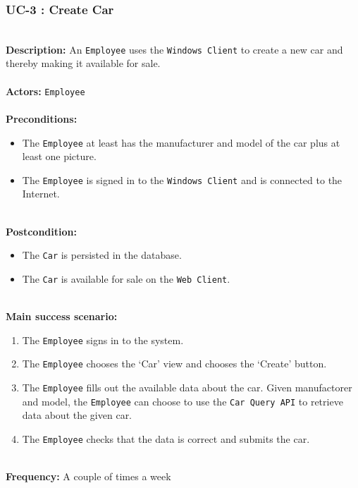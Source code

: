 \subsubsection{UC-3 : Create Car}
\label{create_car_use_case}
\HRule \\[0.4cm]
\textbf{Description:} An \texttt{Employee} uses the \texttt{Windows Client} to create a new car and thereby making it available for sale. \\
\HRule \\[0.4cm]
\textbf{Actors:} \texttt{Employee}\\
\HRule \\[0.4cm]
\textbf{Preconditions:} 
\begin{itemize}
    \item The \texttt{Employee} at least has the manufacturer and model of the car plus at least one picture.
    \item The \texttt{Employee} is signed in to the \texttt{Windows Client} and is connected to the Internet.
\end{itemize}
\HRule \\[0.4cm]
\textbf{Postcondition:}
\begin{itemize}
    \item The \texttt{Car} is persisted in the database.
    \item The \texttt{Car} is available for sale on the \texttt{Web Client}.
\end{itemize}
\HRule \\[0.4cm]
\textbf{Main success scenario:}
\begin{enumerate}
    \item The \texttt{Employee} signs in to the system.
    \item The \texttt{Employee} chooses the `Car' view and chooses the `Create' button.
    \item The \texttt{Employee} fills out the available data about the car. Given manufactorer and model, the \texttt{Employee} can choose to use the \texttt{Car Query API} to retrieve data about the given car.
    \item The \texttt{Employee} checks that the data is correct and submits the car.
\end{enumerate}
\HRule \\[0.4cm]
\textbf{Frequency:}
A couple of times a week \\
\HRule \\[0.4cm]

